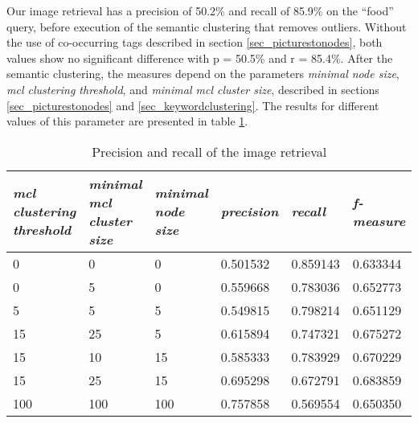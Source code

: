 Our image retrieval has a precision of 50.2\% and recall of 85.9\% on the ``food'' query, before execution of the semantic clustering that removes outliers. Without the use of co-occurring tags described in section \ref{sec_picturestonodes}, both values show no significant difference with p = 50.5\% and r = 85.4\%.
After the semantic clustering, the measures depend on the  parameters \emph{minimal node size}, \emph{mcl clustering threshold}, and \emph{minimal mcl cluster size}, described in sections \ref{sec_picturestonodes} and \ref{sec_keywordclustering}. The results for different values of this parameter are presented in table \ref{tab_retrievalevaluation}.\\

\begin{table}[h]
   \begin{tabular}{| p{2.2cm}| p{2.2cm}| p{2cm} || p{2cm} | p{2cm} | p{2cm} |}
    \hline
    \emph{mcl clustering threshold} & \emph{minimal mcl cluster size} & \emph{minimal node size} & \emph{precision} & \emph{recall} & \emph{f-measure} \\ \hline
    0 	& 0 	& 0 & 0.501532 & 0.859143 & 0.633344 \\ \hline
    0 	& 5 	& 0 & 0.559668 & 0.783036 & 0.652773 \\ \hline
    5 	& 5 	& 5 & 0.549815 & 0.798214 & 0.651129 \\ \hline     
    15 	& 25 &  5 & 0.615894 & 0.747321 & 0.675272 \\ \hline
    15 	& 10 & 15 & 0.585333 & 0.783929 & 0.670229 \\ \hline
    15 	& 25 & 15 & 0.695298 & 0.672791 & 0.683859 \\ \hline
    	100 	& 100 & 100 & 0.757858 & 0.569554 & 0.650350 \\ \hline
    \end{tabular}
    \caption{Precision and recall of the image retrieval}
	\label{tab_retrievalevaluation}
\end{table}


